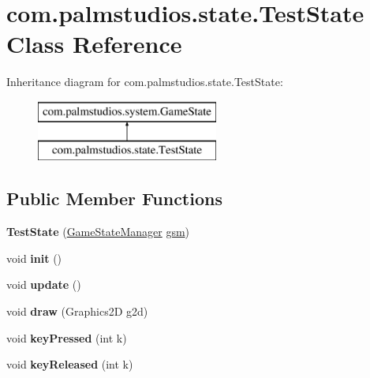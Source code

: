 \hypertarget{classcom_1_1palmstudios_1_1state_1_1_test_state}{}\section{com.\+palmstudios.\+state.\+Test\+State Class Reference}
\label{classcom_1_1palmstudios_1_1state_1_1_test_state}
Inheritance diagram for com.\+palmstudios.\+state.\+Test\+State\+:\begin{figure}[H]
\begin{center}
\leavevmode
\includegraphics[height=2.000000cm]{classcom_1_1palmstudios_1_1state_1_1_test_state}
\end{center}
\end{figure}
\subsection*{Public Member Functions}
\begin{DoxyCompactItemize}
\item 
\mbox{\label{classcom_1_1palmstudios_1_1state_1_1_test_state_ae93a1515acfe7fc0b4636d9ebc16c2de}} 
{\bfseries Test\+State} (\hyperlink{classcom_1_1palmstudios_1_1state_1_1_game_state_manager}{Game\+State\+Manager} \hyperlink{classcom_1_1palmstudios_1_1system_1_1_game_state_a3a9b05fb9a962eabae260371069a79eb}{gsm})
\item 
\mbox{\label{classcom_1_1palmstudios_1_1state_1_1_test_state_acbcb3ddd85cf4e3cb7224397b314e568}} 
void {\bfseries init} ()
\item 
\mbox{\label{classcom_1_1palmstudios_1_1state_1_1_test_state_a9827a3a9cd8b299c8f0d2aef5b905d20}} 
void {\bfseries update} ()
\item 
\mbox{\label{classcom_1_1palmstudios_1_1state_1_1_test_state_ac0e83237182d670e746350298bd62320}} 
void {\bfseries draw} (Graphics2D g2d)
\item 
\mbox{\label{classcom_1_1palmstudios_1_1state_1_1_test_state_a56c7e5fe768e77fa3605dd306088130e}} 
void {\bfseries key\+Pressed} (int k)
\item 
\mbox{\label{classcom_1_1palmstudios_1_1state_1_1_test_state_afc8284215f3662a4cd82753093503560}} 
void {\bfseries key\+Released} (int k)
\end{DoxyCompactItemize}
